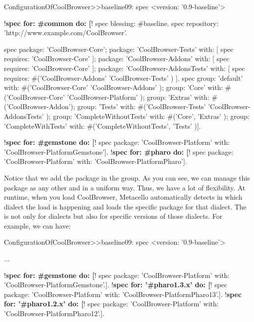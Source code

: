\documentclass[a4paper,10pt,twoside]{book}
\begin{document}
\begin{code}{}
ConfigurationOfCoolBrowser>>baseline09: spec 
      <version: '0.9-baseline'>
      
      !\textbf{spec for: \#common do: [}!
            spec blessing: #baseline.
            spec repository: 'http://www.example.com/CoolBrowser'.
            
            spec 
                  package: 'CoolBrowser-Core';
                  package: 'CoolBrowser-Tests' with: [ spec requires: 'CoolBrowser-Core' ];
                  package: 'CoolBrowser-Addons' with: [ spec requires: 'CoolBrowser-Core' ];
                  package: 'CoolBrowser-AddonsTests' with: [ 
                        spec requires: #('CoolBrowser-Addons' 'CoolBrowser-Tests' ) ].
            spec 
                  group: 'default' with: #('CoolBrowser-Core' 'CoolBrowser-Addons' );
                  group: 'Core' with: #('CoolBrowser-Core' 'CoolBrowser-Platform' );
                  group: 'Extras' with: #('CoolBrowser-Addon');
                  group: 'Tests' with: #('CoolBrowser-Tests' 'CoolBrowser-AddonsTests' );
                  group: 'CompleteWithoutTests' with: #('Core', 'Extras' );
                  group: 'CompleteWithTests' with: #('CompleteWithoutTests', 'Tests' )].
                  
      !\textbf{spec for: \#gemstone do: [}!
            spec package: 'CoolBrowser-Platform' with: 'CoolBrowser-PlatformGemstone'].
      !\textbf{spec for: \#pharo do: [}!
            spec package: 'CoolBrowser-Platform' with: 'CoolBrowser-PlatformPharo'].
\end{code}

Notice that we add the package  in the  group. As you can see, we can manage this package as any other and in a uniform way. Thus, we have a lot of flexibility. At runtime, when you load CoolBrowser, Metacello automatically detects in which dialect the load is happening and loads the specific package for that dialect. The  is not only for dialects but also for specific versions of those dialects. For example, we can have:

\begin{code}{}
ConfigurationOfCoolBrowser>>baseline09: spec 
      <version: '0.9-baseline'>

      ...
                   
       !\textbf{spec for: \#gemstone do: [}!
              spec package: 'CoolBrowser-Platform' with: 'CoolBrowser-PlatformGemstone'.].
       !\textbf{spec for: '\#pharo1.3.x' do: [}!
              spec package: 'CoolBrowser-Platform' with: 'CoolBrowser-PlatformPharo13'.].          
       !\textbf{spec for: '\#pharo1.2.x' do: [}!
              spec package: 'CoolBrowser-Platform' with: 'CoolBrowser-PlatformPharo12'.].          
      
\end{code}
\end{document}
